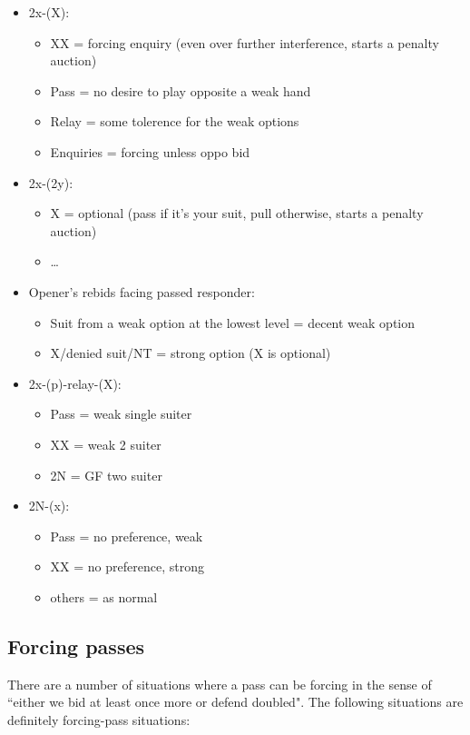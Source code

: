 \documentclass[a4paper,14pt]{extarticle}
\begin{document}
\begin{itemize}
\item 2x-(X):
   \begin{itemize}
      \item XX = forcing enquiry (even over further interference, starts a penalty auction)
      \item Pass = no desire to play opposite a weak hand
      \item Relay = some tolerence for the weak options
      \item Enquiries = forcing unless oppo bid
   \end{itemize}
\item 2x-(2y):
   \begin{itemize}
      \item X = optional (pass if it's your suit, pull otherwise, starts a penalty auction)
      \item \ldots
   \end{itemize}
\item Opener's rebids facing passed responder:
   \begin{itemize}
   \item Suit from a weak option at the lowest level = decent weak option
   \item X/denied suit/NT = strong option (X is optional)
   \end{itemize}
\item 2x-(p)-relay-(X):
   \begin{itemize}
	\item Pass = weak single suiter
	\item XX = weak 2 suiter
	\item 2N = GF two suiter
   \end{itemize}
\item 2N-(x):
   \begin{itemize}
	\item Pass = no preference, weak
	\item XX = no preference, strong
	\item others = as normal
   \end{itemize}
\end{itemize}

\subsection{Forcing passes}
\label{sec:forcepass}

There are a number of situations where a pass can be forcing in the sense of
``either we bid at least once more or defend doubled". The following situations
are definitely forcing-pass situations:
\end{document}

